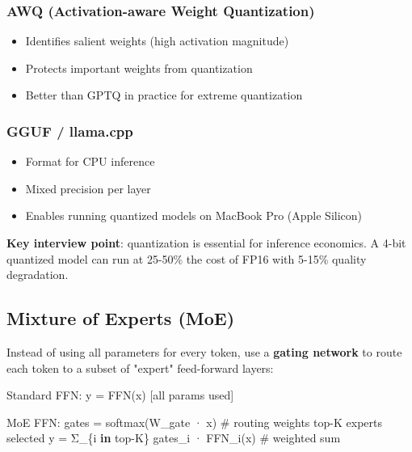 \documentclass[11pt]{article}
\providecommand{\tightlist}{\setlength{\itemsep}{1pt}\setlength{\parskip}{0pt}}
\newenvironment{Shaded}{\begin{snugshade}}{\end{snugshade}}
\newcommand{\BuiltInTok}[1]{\textcolor[rgb]{0.50,0.55,0.55}{#1}}
\newcommand{\CommentTok}[1]{\textcolor[rgb]{0.48,0.49,0.49}{#1}}
\newcommand{\KeywordTok}[1]{\textcolor[rgb]{0.81,0.81,0.76}{\textbf{#1}}}
\newcommand{\NormalTok}[1]{\textcolor[rgb]{0.81,0.81,0.76}{#1}}
\newcommand{\OperatorTok}[1]{\textcolor[rgb]{0.81,0.81,0.76}{#1}}
\begin{document}
\subsubsection{AWQ (Activation-aware Weight Quantization)}\label{awq-activation-aware-weight-quantization}

\begin{itemize}
\tightlist
\item
  Identifies salient weights (high activation magnitude)
\item
  Protects important weights from quantization
\item
  Better than GPTQ in practice for extreme quantization
\end{itemize}

\subsubsection{GGUF / llama.cpp}\label{gguf--llamacpp}

\begin{itemize}
\tightlist
\item
  Format for CPU inference
\item
  Mixed precision per layer
\item
  Enables running quantized models on MacBook Pro (Apple Silicon)
\end{itemize}

\textbf{Key interview point}: quantization is essential for inference economics. A 4-bit quantized model can run at 25-50\% the cost of FP16 with 5-15\% quality degradation.

\subsection{Mixture of Experts (MoE)}\label{mixture-of-experts-moe}

Instead of using all parameters for every token, use a \textbf{gating network} to route each token to a subset of "expert" feed-forward layers:


\begin{Shaded}
\begin{Highlighting}[]
\NormalTok{Standard FFN: y }\OperatorTok{=}\NormalTok{ FFN(x)   [}\BuiltInTok{all}\NormalTok{ params used]}

\NormalTok{MoE FFN:}
\NormalTok{  gates }\OperatorTok{=}\NormalTok{ softmax(W\_gate · x)         }\CommentTok{\# routing weights}
\NormalTok{  top}\OperatorTok{{-}}\NormalTok{K experts selected}
\NormalTok{  y }\OperatorTok{=}\NormalTok{ Σ\_\{i }\KeywordTok{in}\NormalTok{ top}\OperatorTok{{-}}\NormalTok{K\} gates\_i · FFN\_i(x)   }\CommentTok{\# weighted sum}
\end{Highlighting}
\end{Shaded}
\end{document}
